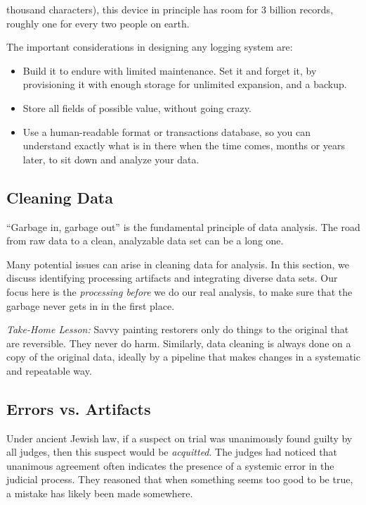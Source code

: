 \documentclass[10pt]{article}
\begin{document}

thousand characters), this device in principle has room for 3 billion records, roughly one for every two people on earth.

The important considerations in designing any logging system are:

\begin{itemize}
  \item Build it to endure with limited maintenance. Set it and forget it, by provisioning it with enough storage for unlimited expansion, and a backup.
  \item Store all fields of possible value, without going crazy.
  \item Use a human-readable format or transactions database, so you can understand exactly what is in there when the time comes, months or years later, to sit down and analyze your data.
\end{itemize}

\subsection{Cleaning Data}
``Garbage in, garbage out'' is the fundamental principle of data analysis. The road from raw data to a clean, analyzable data set can be a long one.

Many potential issues can arise in cleaning data for analysis. In this section, we discuss identifying processing artifacts and integrating diverse data sets. Our focus here is the \textit{processing before} we do our real analysis, to make sure that the garbage never gets in in the first place.

\textit{Take-Home Lesson:} Savvy painting restorers only do things to the original that are reversible. They never do harm. Similarly, data cleaning is always done on a copy of the original data, ideally by a pipeline that makes changes in a systematic and repeatable way.

\subsection{Errors vs. Artifacts}
Under ancient Jewish law, if a suspect on trial was unanimously found guilty by all judges, then this suspect would be \textit{acquitted}. The judges had noticed that unanimous agreement often indicates the presence of a systemic error in the judicial process. They reasoned that when something seems too good to be true, a mistake has likely been made somewhere.
\end{document}
